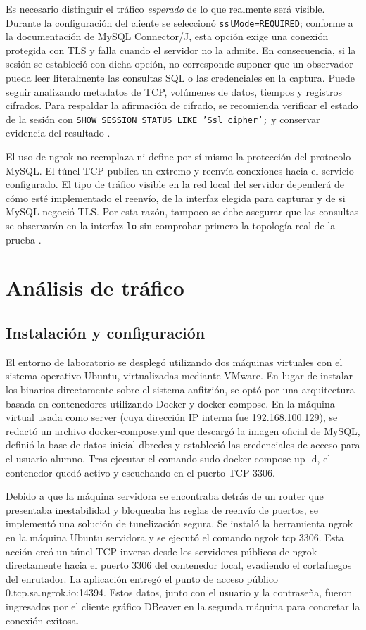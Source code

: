 \documentclass[10pt,a4paper]{article}
\begin{document}
Es necesario distinguir el tráfico \emph{esperado} de lo que realmente será visible. Durante la configuración del cliente se seleccionó \texttt{sslMode=REQUIRED}; conforme a la documentación de MySQL Connector/J, esta opción exige una conexión protegida con TLS y falla cuando el servidor no la admite. En consecuencia, si la sesión se estableció con dicha opción, no corresponde suponer que un observador pueda leer literalmente las consultas SQL o las credenciales en la captura. Puede seguir analizando metadatos de TCP, volúmenes de datos, tiempos y registros cifrados. Para respaldar la afirmación de cifrado, se recomienda verificar el estado de la sesión con \texttt{SHOW SESSION STATUS LIKE 'Ssl\_cipher';} y conservar evidencia del resultado \cite{mysqlssl}.

El uso de ngrok no reemplaza ni define por sí mismo la protección del protocolo MySQL. El túnel TCP publica un extremo y reenvía conexiones hacia el servicio configurado. El tipo de tráfico visible en la red local del servidor dependerá de cómo esté implementado el reenvío, de la interfaz elegida para capturar y de si MySQL negoció TLS. Por esta razón, tampoco se debe asegurar que las consultas se observarán en la interfaz \texttt{lo} sin comprobar primero la topología real de la prueba \cite{ngroktcp}.

\clearpage
\section{Análisis de tráfico}
\label{cap:analisis}

\subsection{Instalación y configuración}
\label{sub:instalacion}
El entorno de laboratorio se desplegó utilizando dos máquinas virtuales con el sistema operativo Ubuntu, virtualizadas mediante VMware. En lugar de instalar los binarios directamente sobre el sistema anfitrión, se optó por una arquitectura basada en contenedores utilizando Docker y docker-compose. En la máquina virtual usada como server (cuya dirección IP interna fue 192.168.100.129), se redactó un archivo docker-compose.yml que descargó la imagen oficial de MySQL, definió la base de datos inicial dbredes y estableció las credenciales de acceso para el usuario alumno. Tras ejecutar el comando sudo docker compose up -d, el contenedor quedó activo y escuchando en el puerto TCP 3306.

Debido a que la máquina servidora se encontraba detrás de un router que presentaba inestabilidad y bloqueaba las reglas de reenvío de puertos, se implementó una solución de tunelización segura. Se instaló la herramienta ngrok en la máquina Ubuntu servidora y se ejecutó el comando ngrok tcp 3306. Esta acción creó un túnel TCP inverso desde los servidores públicos de ngrok directamente hacia el puerto 3306 del contenedor local, evadiendo el cortafuegos del enrutador. La aplicación entregó el punto de acceso público 0.tcp.sa.ngrok.io:14394. Estos datos, junto con el usuario y la contraseña, fueron ingresados por el cliente gráfico DBeaver en la segunda máquina para concretar la conexión exitosa.
\end{document}
